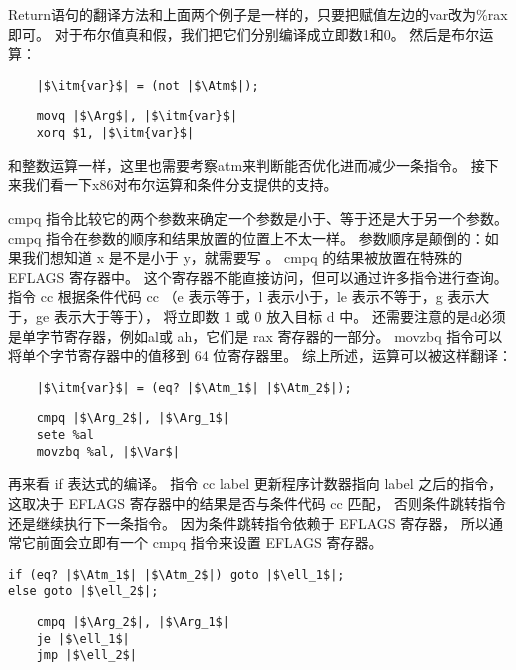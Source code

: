 Return语句的翻译方法和上面两个例子是一样的，只要把赋值左边的var改为\%rax即可。
对于布尔值真和假，我们把它们分别编译成立即数1和0。
然后是布尔运算：
\begin{transformation}
\begin{lstlisting}
    |$\itm{var}$| = (not |$\Atm$|);
\end{lstlisting}
\compilesto
\begin{lstlisting}
    movq |$\Arg$|, |$\itm{var}$|
    xorq $1, |$\itm{var}$|
\end{lstlisting}
\end{transformation}
和整数运算一样，这里也需要考察atm来判断能否优化进而减少一条指令。
接下来我们看一下x86对布尔运算和条件分支提供的支持。

cmpq 指令比较它的两个参数来确定一个参数是小于、等于还是大于另一个参数。
cmpq 指令在参数的顺序和结果放置的位置上不太一样。
参数顺序是颠倒的：如果我们想知道 x 是不是小于 y，就需要写 。
cmpq 的结果被放置在特殊的 EFLAGS 寄存器中。
这个寄存器不能直接访问，但可以通过许多指令进行查询。
指令 cc  根据条件代码 cc
（e 表示等于，l 表示小于，le 表示不等于，g 表示大于，ge 表示大于等于），
将立即数 1 或 0 放入目标 d 中。
还需要注意的是d必须是单字节寄存器，例如al或 ah，它们是 rax 寄存器的一部分。
movzbq 指令可以将单个字节寄存器中的值移到 64 位寄存器里。
综上所述，运算可以被这样翻译：
\begin{transformation}
\begin{lstlisting}
    |$\itm{var}$| = (eq? |$\Atm_1$| |$\Atm_2$|);
\end{lstlisting}
\compilesto
\begin{lstlisting}
    cmpq |$\Arg_2$|, |$\Arg_1$|
    sete %al
    movzbq %al, |$\Var$|
\end{lstlisting}
\end{transformation}

再来看 if 表达式的编译。
指令 cc label 更新程序计数器指向 label 之后的指令，
这取决于 EFLAGS 寄存器中的结果是否与条件代码 cc 匹配，
否则条件跳转指令还是继续执行下一条指令。
因为条件跳转指令依赖于 EFLAGS 寄存器，
所以通常它前面会立即有一个 cmpq 指令来设置 EFLAGS 寄存器。

\begin{transformation}
\begin{lstlisting}
if (eq? |$\Atm_1$| |$\Atm_2$|) goto |$\ell_1$|;
else goto |$\ell_2$|;
\end{lstlisting}
\compilesto
\begin{lstlisting}
    cmpq |$\Arg_2$|, |$\Arg_1$|
    je |$\ell_1$|
    jmp |$\ell_2$|
\end{lstlisting}
\end{transformation}

